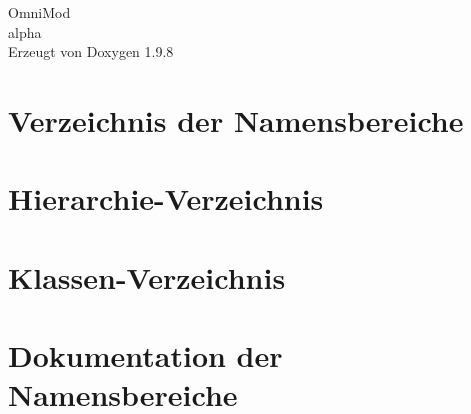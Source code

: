 \documentclass[twoside]{book}
\newcommand{\+}{\discretionary{\mbox{\scriptsize$\hookleftarrow$}}{}{}}
\newcommand{\clearemptydoublepage}{%
    \newpage{\pagestyle{empty}\cleardoublepage}%
  }
\begin{document}
  \raggedbottom
  \begin{titlepage}
  \vspace*{7cm}
  \begin{center}%
  {\Large Omni\+Mod}\\
  [1ex]\large alpha \\
  \vspace*{1cm}
  {\large Erzeugt von Doxygen 1.9.8}\\
  \end{center}
  \end{titlepage}
  \clearemptydoublepage
  \tableofcontents
  \clearemptydoublepage
\chapter{Verzeichnis der Namensbereiche}

\chapter{Hierarchie-\/\+Verzeichnis}

\chapter{Klassen-\/\+Verzeichnis}

\chapter{Dokumentation der Namensbereiche}

















\end{document}
